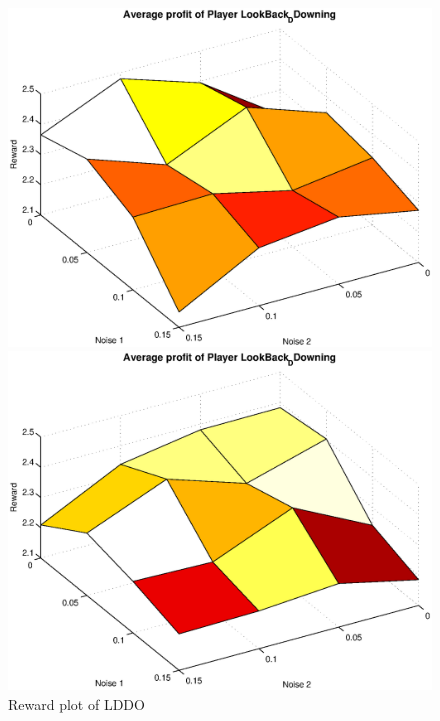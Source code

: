 \begin{figure}[h]
	\caption{Reward plot of LDDO}
	\label{pic player lbdd}
\begin{minipage}[hbt]{0.65\textwidth}
	\centering
	\includegraphics[width=\textwidth]{pics/simulation1/Reward_vs_Noise_of_Player_LookBack_DDowning}
\end{minipage}
\hfill
\begin{minipage}[hbt]{0.3\textwidth}
	\centering
	\includegraphics[width=\textwidth]{pics/simulation2/Reward_vs_Noise_of_Player_LookBack_DDowning}
\end{minipage}

\end{figure}

